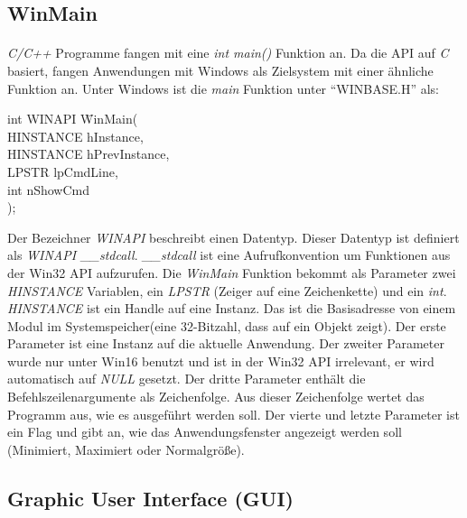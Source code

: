 \subsection{WinMain}
\paragraph{}
\textit{C/C++} Programme fangen mit eine \textit{int main()} Funktion an. Da die API auf \textit{C} basiert, fangen Anwendungen mit Windows als Zielsystem mit einer ähnliche Funktion an. Unter Windows ist die \textit{main} Funktion unter "`WINBASE.H"' als:

\begin{tabbing}

int WINAPI \=WinMain(\\
    			\>HINSTANCE hInstance,\\
    			\>HINSTANCE hPrevInstance,\\
    			\>LPSTR lpCmdLine,\\
    			\>int nShowCmd\\
			\>);
\\
\end{tabbing}

Der Bezeichner \textit{WINAPI} beschreibt einen Datentyp. Dieser Datentyp ist definiert als \textit{WINAPI \_\_stdcall}. \textit{\_\_stdcall} ist eine Aufrufkonvention um Funktionen aus der Win32 API aufzurufen. Die \textit{WinMain} Funktion bekommt als Parameter zwei \textit{HINSTANCE} Variablen, ein \textit{LPSTR} (Zeiger auf eine Zeichenkette) und ein \textit{int}.\\


\textit{HINSTANCE} ist ein Handle auf eine Instanz. Das ist die Basisadresse von einem Modul im Systemspeicher(eine 32-Bitzahl, dass auf ein Objekt zeigt). Der erste Parameter ist eine Instanz auf die aktuelle Anwendung. Der zweiter Parameter wurde nur unter Win16 benutzt und ist in der Win32 API irrelevant, er wird automatisch auf \textit{NULL} gesetzt. Der dritte Parameter enthält die Befehlszeilenargumente als Zeichenfolge. Aus dieser Zeichenfolge wertet das Programm aus, wie es ausgeführt werden soll. Der vierte und letzte Parameter ist ein Flag und gibt an, wie das Anwendungsfenster angezeigt werden soll (Minimiert, Maximiert oder Normalgröße).

\subsection{Graphic User Interface (GUI)}
